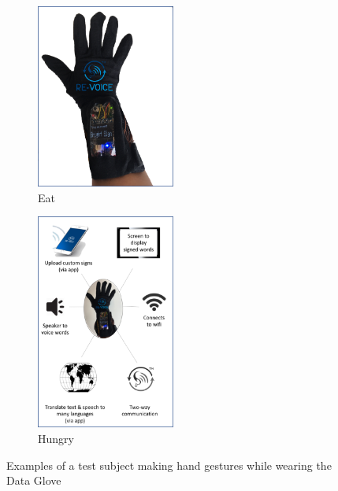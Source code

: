 \begin{figure}
    \begin{subfigure}
        \centering
        \includegraphics[width=0.5\textwidth]{./assets/img/Glove}
        \caption{Eat}
        \label{fig:glove}
    \end{subfigure}
    \begin{subfigure}
        \centering
        \includegraphics[width=0.5\textwidth]{./assets/img/GloveFeatures}
        \caption{Hungry}
        \label{fig:glovefeatures}
    \end{subfigure}
    \caption{Examples of a test subject making hand gestures while wearing the Data Glove}
    \label{fig:prototype2}
\end{figure}

